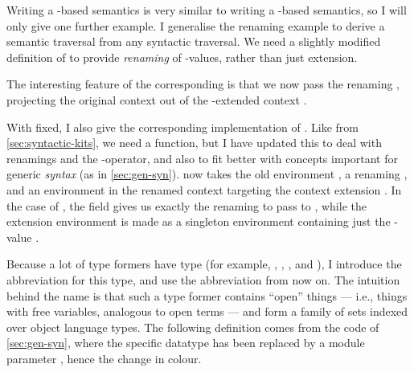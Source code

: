 
Writing a \AgdaFunction{$\Box$}-based semantics is very similar to writing a
\AgdaFunction{$\bigcirc$}-based semantics, so I will only give one further
example.
I generalise the renaming example to derive a semantic traversal from any
syntactic traversal.
We need a slightly modified definition of  to provide
\emph{renaming} of \AgdaBound{$\V$}-values, rather than just extension.


The interesting feature of the corresponding  is that
we now pass  the renaming , projecting
the original context \AgdaBound{$\Gamma$} out of the
-extended context
.


With  fixed, I also give the corresponding implementation
of .
Like  from \cref{sec:syntactic-kits}, we need a
 function, but I have updated this to deal with renamings
and the \AgdaFunction{$\Box$}-operator, and also to fit better with concepts
important for generic \emph{syntax} (as in \cref{sec:gen-syn}).
 now takes the old environment \AgdaBound{$\rho$}%
\AgdaSpace{}\AgdaSymbol{:}\AgdaSpace{}\AgdaFunction{[}\AgdaSpace{}%
\AgdaBound{$\V$}\AgdaSpace{}\AgdaFunction{]}\AgdaSpace{}\AgdaBound{$\Gamma$}%
\AgdaSpace{}\AgdaSpace{}\AgdaBound{$\Delta$}, a
renaming \AgdaSpace{}\AgdaSymbol{:}\AgdaSpace{}%
\AgdaSpace{}\AgdaBound{$\Gamma^{+}$}\AgdaSpace{}%
\AgdaBound{$\Gamma$}, and an environment \AgdaBound{$\sigma$} in the renamed
context \AgdaBound{$\Gamma^{+}$} targeting the context extension
.
In the  case of , the
 field gives us exactly the renaming to
pass to , while the extension environment
\AgdaBound{$\sigma$} is made as a singleton environment containing just the
-value .


Because a lot of type formers have type
\AgdaSpace{}\AgdaSymbol{$\to$}\AgdaSpace{}%
\AgdaSpace{}\AgdaSymbol{$\to$}\AgdaSpace{}
(for example, \AgdaRecord{\_$\ni$\_}, \AgdaDatatype{\_$\vdash$\_},
\AgdaBound{$\V$}, and \AgdaBound{$\C$}),
I introduce the abbreviation  for this type, and use the
abbreviation from now on.
The intuition behind the name is that such a type former contains ``open''
things --- i.e., things with free variables, analogous to open terms --- and
form a family of sets indexed over object language types.
The following definition comes from the code of \cref{sec:gen-syn}, where the
specific datatype  has been replaced by a module parameter
, hence the change in colour.

